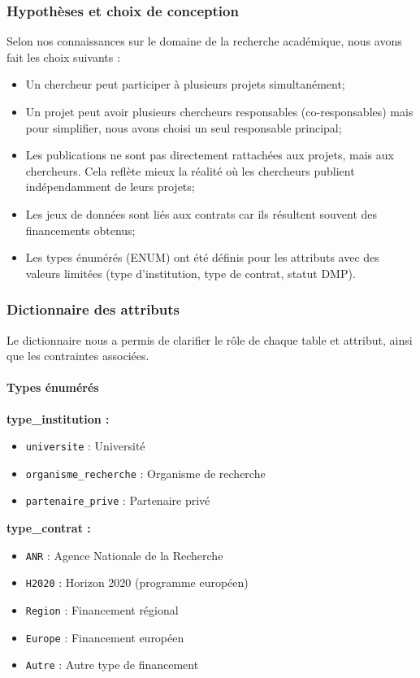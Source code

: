 \documentclass[12pt,a4paper]{article}
\begin{document}
\subsubsection{Hypothèses et choix de conception}
Selon nos connaissances sur le domaine de la recherche académique, nous avons fait les choix suivants :
\begin{itemize}
    \item Un chercheur peut participer à plusieurs projets simultanément;
    \item Un projet peut avoir plusieurs chercheurs responsables (co-responsables) mais pour simplifier, nous avons choisi un seul responsable principal;
    \item Les publications ne sont pas directement rattachées aux projets, mais aux chercheurs. Cela reflète mieux la réalité où les chercheurs publient indépendamment de leurs projets;
    \item Les jeux de données sont liés aux contrats car ils résultent souvent des financements obtenus;
    \item Les types énumérés (ENUM) ont été définis pour les attributs avec des valeurs limitées (type d'institution, type de contrat, statut DMP).
\end{itemize}

\subsubsection{Dictionnaire des attributs}

Le dictionnaire nous a permis de clarifier le rôle de chaque table et attribut, ainsi que les contraintes associées.

\paragraph{Types énumérés}

\textbf{type\_institution :}
\begin{itemize}
    \item \texttt{universite} : Université
    \item \texttt{organisme\_recherche} : Organisme de recherche
    \item \texttt{partenaire\_prive} : Partenaire privé
\end{itemize}

\textbf{type\_contrat :}
\begin{itemize}
    \item \texttt{ANR} : Agence Nationale de la Recherche
    \item \texttt{H2020} : Horizon 2020 (programme européen)
    \item \texttt{Region} : Financement régional
    \item \texttt{Europe} : Financement européen
    \item \texttt{Autre} : Autre type de financement
\end{itemize}
\end{document}
